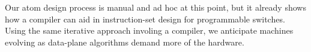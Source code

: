 Our atom design process is manual and ad hoc at this point, but it already
shows how  a compiler can aid in instruction-set design for programmable
switches. Using the same iterative approach involing a compiler, we anticipate
\absmachine machines evolving as data-plane algorithms demand more of the
hardware.

%
